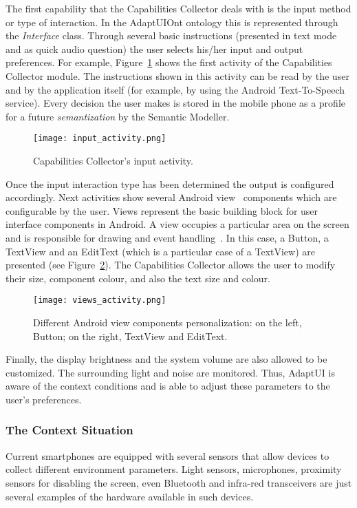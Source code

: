 The first capability that the Capabilities Collector deals with is the input
method or type of interaction. In the AdaptUIOnt ontology this is represented
through the \textit{Interface} class. Through several basic instructions
(presented in text mode and as quick audio question) the user selects his/her
input and output preferences. For example, Figure~\ref{fig:input_activity} shows
the first activity of the Capabilities Collector module. The instructions shown
in this activity can be read by the user and by the application itself (for
example, by using the Android Text-To-Speech~\citep{tts} service). Every decision
the user makes is stored in the mobile phone as a profile for a future
\textit{semantization} by the Semantic Modeller.

\begin{figure}
\centering
\texttt{[image: input\_activity.png]}
\caption{Capabilities Collector's input activity.}
\label{fig:input_activity}
\end{figure}

Once the input interaction type has been determined the output is configured 
accordingly. Next activities show several Android view~\citep{android_view} 
components which are configurable by the user. Views represent the basic 
building block for user interface components in Android. A view occupies a 
particular area on the screen and is responsible for drawing and event 
handling~\citep{android_view}. In this case, a Button, a TextView and an 
EditText (which is a particular case of a TextView) are presented (see 
Figure~\ref{fig:views_activity}). The Capabilities Collector allows the user to 
modify their size, component colour, and also the text size and colour.

\begin{figure}
\centering
\texttt{[image: views\_activity.png]}
\caption{Different Android view components
personalization: on the left, Button; on the right, TextView and EditText.}
\label{fig:views_activity}
\end{figure}

Finally, the display brightness and the system volume are also allowed to be
customized. The surrounding light and noise are monitored. Thus, AdaptUI is
aware of the context conditions and is able to adjust these parameters to 
the user's preferences.

 
\subsubsection{The Context Situation}
\label{sec:context_situation}
Current smartphones are equipped with several sensors that allow devices to
collect different environment parameters. Light sensors, microphones, proximity 
sensors for disabling the screen, even Bluetooth and infra-red transceivers are 
just several examples of the hardware available in such devices.

